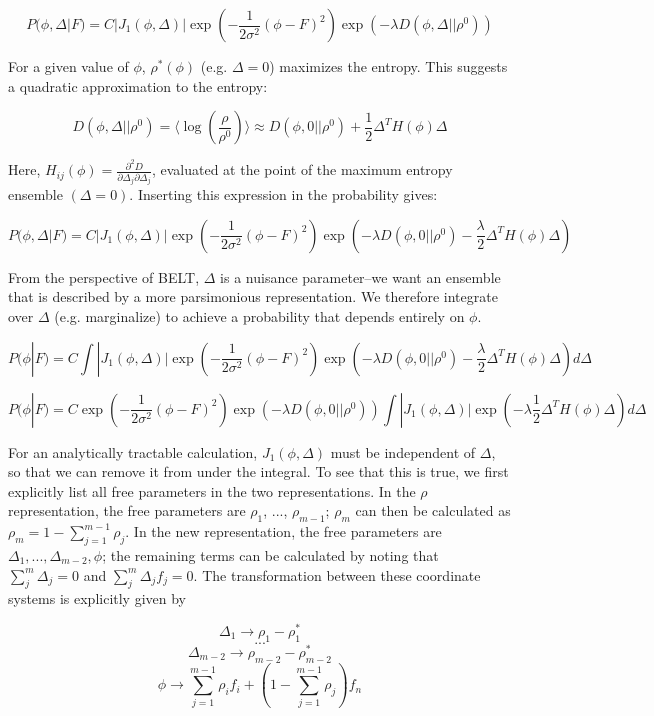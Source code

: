 \documentclass[12pt]{article}
\begin{document}
$$P(\phi, \Delta | F) = C |J_1(\phi, \Delta)| \exp(-\frac{1}{2\sigma^2} (\phi - F)^2) \exp(-\lambda D(\phi, \Delta|| \rho^0)) $$

For a given value of $\phi$, $\rho^*(\phi)$ (e.g. $\Delta = 0$) maximizes the entropy.  This suggests a quadratic approximation to the entropy:

$$D(\phi, \Delta|| \rho^0) = \langle \log(\frac{\rho}{\rho^0})\rangle \approx D(\phi, 0|| \rho^0) + \frac{1}{2} \Delta^T H(\phi) \Delta$$

Here, $H_{ij}(\phi) = \frac{\partial^2 D}{\partial \Delta_j \partial \Delta_j}$, evaluated at the point of the maximum entropy ensemble $(\Delta = 0)$.  Inserting this expression in the probability gives:

$$P(\phi, \Delta | F) = C |J_1(\phi, \Delta)| \exp(-\frac{1}{2\sigma^2} (\phi - F)^2) \exp(-\lambda  D(\phi, 0|| \rho^0) - \frac{\lambda}{2} \Delta^T H(\phi) \Delta)$$

From the perspective of BELT, $\Delta$ is a nuisance parameter--we want an ensemble that is described by a more parsimonious representation.  We therefore integrate over $\Delta$ (e.g. marginalize) to achieve a probability that depends entirely on $\phi$.  

$$P(\phi | F) = C \int |J_1(\phi, \Delta)| \exp(-\frac{1}{2\sigma^2} (\phi - F)^2) \exp(-\lambda  D(\phi, 0|| \rho^0) - \frac{\lambda}{2} \Delta^T H(\phi) \Delta) d\Delta $$

$$P(\phi | F) = C \exp(-\frac{1}{2\sigma^2} (\phi - F)^2) \exp(-\lambda  D(\phi, 0|| \rho^0))  \int |J_1(\phi, \Delta)|  \exp(-\lambda \frac{1}{2} \Delta^T H(\phi) \Delta) d\Delta $$

For an analytically tractable calculation, $J_1(\phi, \Delta)$ must be independent of $\Delta$, so that we can remove it from under the integral.  To see that this is true, we first explicitly list all free parameters in the two representations.  In the $\rho$ representation, the free parameters are $\rho_1$, ..., $\rho_{m-1}$; $\rho_m$ can then be calculated as $\rho_m = 1 - \sum_{j=1}^{m-1} \rho_j$.  In the new representation, the free parameters are $\Delta_1, ..., \Delta_{m-2}, \phi$; the remaining terms can be calculated by noting that $\sum_j^m \Delta_j = 0$ and $\sum_j^m \Delta_j f_j = 0$.  The transformation between these coordinate systems is explicitly given by

$$\Delta_1 \rightarrow \rho_1 - \rho_1^*$$
$$...$$
$$\Delta_{m-2} \rightarrow \rho_{m-2} - \rho_{m-2}^*$$
$$\phi \rightarrow \sum_{j=1}^{m-1} \rho_i f_i + (1 - \sum_{j=1}^{m-1} \rho_j) f_n$$
\end{document}
